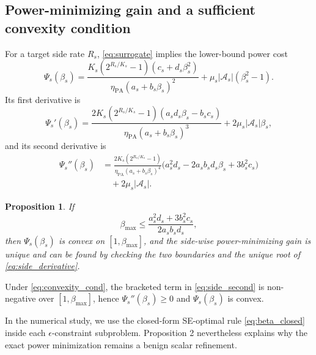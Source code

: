 \documentclass[journal]{IEEEtran}
\newtheorem{proposition}{Proposition}
\begin{document}
\subsection{Power-minimizing gain and a sufficient convexity condition}
For a target side rate $R_s$, \eqref{eq:surrogate} implies the lower-bound power cost
\begin{equation}
\Psi_s(\beta_s)=
\frac{K_s(2^{R_s/K_s}-1)(c_s+d_s\beta_s^2)}{\eta_{\mathrm{PA}}(a_s+b_s\beta_s)^2}
+\mu_s|\mathcal{A}_s|(\beta_s^2-1).
\label{eq:side_cost}
\end{equation}
Its first derivative is
\begin{equation}
\Psi_s'(\beta_s)=
\frac{2K_s(2^{R_s/K_s}-1)(a_sd_s\beta_s-b_sc_s)}{\eta_{\mathrm{PA}}(a_s+b_s\beta_s)^3}
+2\mu_s|\mathcal{A}_s|\beta_s,
\label{eq:side_derivative}
\end{equation}
and its second derivative is
\begin{equation}
\begin{aligned}
\Psi_s''(\beta_s)
&=\frac{2K_s(2^{R_s/K_s}-1)}{\eta_{\mathrm{PA}}(a_s+b_s\beta_s)^4}
\Big(a_s^2d_s-2a_sb_sd_s\beta_s+3b_s^2c_s\Big) \\
&\quad +2\mu_s|\mathcal{A}_s|.
\end{aligned}
\label{eq:side_second}
\end{equation}

\begin{proposition}
If
\begin{equation}
\beta_{\max}
\le
\frac{a_s^2d_s+3b_s^2c_s}{2a_sb_sd_s},
\label{eq:convexity_cond}
\end{equation}
then $\Psi_s(\beta_s)$ is convex on $[1,\beta_{\max}]$, and the side-wise power-minimizing gain is unique and can be found by checking the two boundaries and the unique root of \eqref{eq:side_derivative}.
\end{proposition}

\begin{IEEEproof}
Under \eqref{eq:convexity_cond}, the bracketed term in \eqref{eq:side_second} is non-negative over $[1,\beta_{\max}]$, hence $\Psi_s''(\beta_s)\ge 0$ and $\Psi_s(\beta_s)$ is convex.
\end{IEEEproof}

In the numerical study, we use the closed-form SE-optimal rule \eqref{eq:beta_closed} inside each $\epsilon$-constraint subproblem. Proposition 2 nevertheless explains why the exact power minimization remains a benign scalar refinement.
\end{document}
